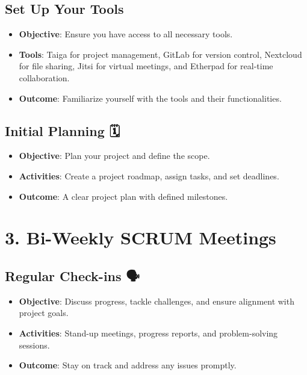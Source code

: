 \documentclass[
  letterpaper,
  DIV=11,
  numbers=noendperiod]{scrreprt}
\providecommand{\tightlist}{%
  \setlength{\itemsep}{0pt}\setlength{\parskip}{0pt}}\usepackage{longtable,booktabs,array}
\begin{document}
\subsection{Set Up Your Tools 🧰}\label{set-up-your-tools}

\begin{itemize}
\tightlist
\item
  \textbf{Objective}: Ensure you have access to all necessary tools.
\item
  \textbf{Tools}: Taiga for project management, GitLab for version
  control, Nextcloud for file sharing, Jitsi for virtual meetings, and
  Etherpad for real-time collaboration.
\item
  \textbf{Outcome}: Familiarize yourself with the tools and their
  functionalities.
\end{itemize}

\subsection{Initial Planning 🗓️}\label{initial-planning}

\begin{itemize}
\tightlist
\item
  \textbf{Objective}: Plan your project and define the scope.
\item
  \textbf{Activities}: Create a project roadmap, assign tasks, and set
  deadlines.
\item
  \textbf{Outcome}: A clear project plan with defined milestones.
\end{itemize}

\section{3. Bi-Weekly SCRUM Meetings 🔄}\label{bi-weekly-scrum-meetings}

\subsection{Regular Check-ins 🗣️}\label{regular-check-ins-1}

\begin{itemize}
\tightlist
\item
  \textbf{Objective}: Discuss progress, tackle challenges, and ensure
  alignment with project goals.
\item
  \textbf{Activities}: Stand-up meetings, progress reports, and
  problem-solving sessions.
\item
  \textbf{Outcome}: Stay on track and address any issues promptly.
\end{itemize}
\end{document}
